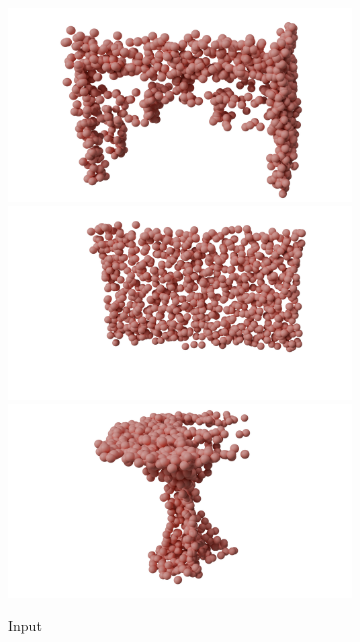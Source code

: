 \begin{figure}[htb]
  \centering
  \begin{subfigure}[t]{0.315\textwidth}
    \includegraphics[width=\textwidth]{figures/gp/t1pgp.png}
    \includegraphics[width=\textwidth]{figures/gp/t2pgp.png}
    \includegraphics[width=\textwidth]{figures/gp/t3pgp.png}
    \caption{Input}\label{fig:gptable1}
  \end{subfigure}\hfill
  \begin{subfigure}[t]{0.315\textwidth}

\end{subfigure}
\end{figure}
